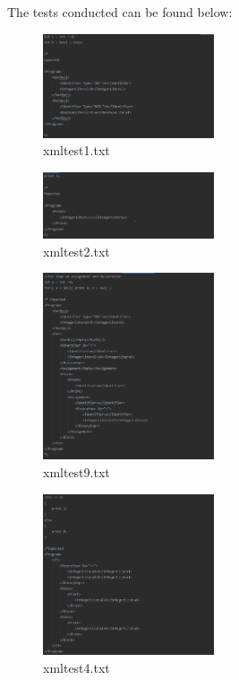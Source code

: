 \documentclass{article}
\begin{document}
				The tests conducted can be found below:
				\begin{multicols}{2}
			
			
				\begin{figure}[H]
					\centering
			 			\includegraphics[width=0.45\textwidth]{xmltest1.png}
			 			\centering
			  			\caption{xmltest1.txt}
			  			\label{fig:xmltest1}
					\end{figure}
					
			\begin{figure}[H]
					\centering
			 			\includegraphics[width=0.45\textwidth]{xmltest2.png}
			 			\centering
			  			\caption{xmltest2.txt}
			  			\label{fig:xmltest2}
					\end{figure}
					
										
					\begin{figure}[H]
					\centering
			 			\includegraphics[width=0.45\textwidth]{xmltest9.png}
			 			\centering
			  			\caption{xmltest9.txt}
			  			\label{fig:xmltest9}
					\end{figure}
					

					
					\begin{figure}[H]
					\centering
			 			\includegraphics[width=0.45\textwidth]{xmltest4.png}
			 			\centering
			  			\caption{xmltest4.txt}
			  			\label{fig:xmltest4}
					\end{figure}
					

\end{multicols}
\end{document}
